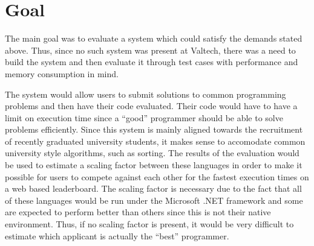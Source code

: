 \section{Goal}
The main goal was to evaluate a system which could satisfy the demands stated above. Thus, since no such system was present at Valtech, there was a need to build the system and then evaluate it through test cases with performance and memory consumption in mind.

The system would allow users to submit solutions to common programming problems and then have their code evaluated. Their code would have to have a limit on execution time since a ``good'' programmer should be able to solve problems efficiently. Since this system is mainly aligned towards the recruitment of recently graduated university students, it makes sense to accomodate common university style algorithms, such as sorting. The results of the evaluation would be used to estimate a scaling factor between these languages in order to make it possible for users to compete against each other for the fastest execution times on a web based leaderboard. The scaling factor is necessary due to the fact that all of these languages would be run under the Microsoft .NET framework and some are expected to perform better than others since this is not their native environment. Thus, if no scaling factor is present, it would be very difficult to estimate which applicant is actually the ``best'' programmer.
